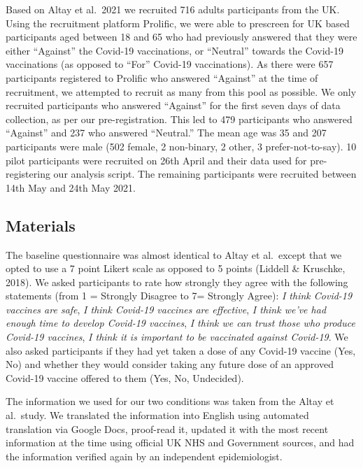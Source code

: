 \documentclass[
  english,
  ,jou,floatsintext]{apa6}
\begin{document}
Based on Altay et al.~2021 we recruited 716 adults participants from the UK. Using the recruitment platform Prolific, we were able to prescreen for UK based participants aged between 18 and 65 who had previously answered that they were either ``Against'' the Covid-19 vaccinations, or ``Neutral'' towards the Covid-19 vaccinations (as opposed to ``For'' Covid-19 vaccinations). As there were 657 participants registered to Prolific who answered ``Against'' at the time of recruitment, we attempted to recruit as many from this pool as possible. We only recruited participants who answered ``Against'' for the first seven days of data collection, as per our pre-registration. This led to 479 participants who answered ``Against'' and 237 who answered ``Neutral.'' The mean age was 35 and 207 participants were male (502 female, 2 non-binary, 2 other, 3 prefer-not-to-say). 10 pilot participants were recruited on 26th April and their data used for pre-registering our analysis script. The remaining participants were recruited between 14th May and 24th May 2021.

\hypertarget{materials}{%
\subsection{Materials}\label{materials}}

The baseline questionnaire was almost identical to Altay et al.~except that we opted to use a 7 point Likert scale as opposed to 5 points (Liddell \& Kruschke, 2018). We asked participants to rate how strongly they agree with the following statements (from 1 = Strongly Disagree to 7= Strongly Agree): \emph{I think Covid-19 vaccines are safe}, \emph{I think Covid-19 vaccines are effective}, \emph{I think we've had enough time to develop Covid-19 vaccines}, \emph{I think we can trust those who produce Covid-19 vaccines}, \emph{I think it is important to be vaccinated against Covid-19}. We also asked participants if they had yet taken a dose of any Covid-19 vaccine (Yes, No) and whether they would consider taking any future dose of an approved Covid-19 vaccine offered to them (Yes, No, Undecided).

The information we used for our two conditions was taken from the Altay et al.~study. We translated the information into English using automated translation via Google Docs, proof-read it, updated it with the most recent information at the time using official UK NHS and Government sources, and had the information verified again by an independent epidemiologist.
\end{document}
